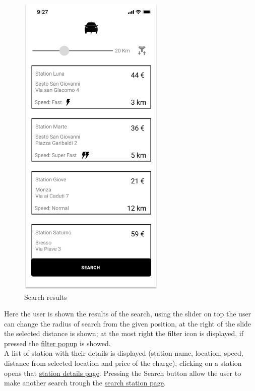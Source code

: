 \begin{figure}[H]
    \centering
    \includegraphics[keepaspectratio, height=15cm]{Mockup/UserAppInterface/Results.png}
    \caption{Search results}
    \label{fig:Results}
\end{figure}
Here the user is shown the results of the search, using the slider on top the user can change the radius of search from the given position, at the right of the slide the selected distance is shown; at the most right the filter icon is displayed, if pressed the \hyperref[fig:Filters]{filter popup} is showed.\\
A list of station with their details is displayed (station name, location, speed, distance from selected location and price of the charge), clicking on a station opens that \hyperref[fig:StationDetails]{station details page}. Pressing the Search button allow the user to make another search trough the \hyperref[fig:Search]{search station page}.
